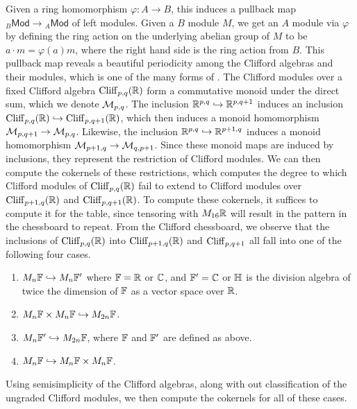 Given a ring homomorphism $\varphi : A \to B$, this induces a pullback map
${}_B\mathsf{Mod} \to {}_A\mathsf{Mod}$ of left modules. Given a $B$ module $M$,
we get an $A$ module via $\varphi$ by defining the ring action on the underlying
abelian group of $M$ to be $a \cdot m = \varphi(a)m$, where the right hand side
is the ring action from $B$. This pullback map reveals a beautiful periodicity
among the Clifford algebras and their modules, which is one of the many forms
of . The Clifford modules over a fixed Clifford algebra
$\operatorname{Cliff}_{p,q}(\mathbb{R})$ form a commutative monoid under the direct sum, which
we denote $\mathcal{M}_{p,q}$. The inclusion $\mathbb{R}^{p,q} \hookrightarrow \mathbb{R}^{p,q+1}$ induces
an inclusion $\operatorname{Cliff}_{p,q}(\mathbb{R}) \hookrightarrow \operatorname{Cliff}_{p,q+1}(\mathbb{R})$, which then
induces a monoid homomorphism $\mathcal{M}_{p,q+1} \to \mathcal{M}_{p,q}$. Likewise, the inclusion
$\mathbb{R}^{p,q}\hookrightarrow \mathbb{R}^{p+1,q}$ induces a monoid homomorphism
$\mathcal{M}_{p+1,q} \to \mathcal{M}_{q,p+1}$. Since these monoid maps are induced by
inclusions, they represent the restriction of Clifford modules. We can then
compute the cokernels of these restrictions, which computes the degree to
which Clifford modules of $\operatorname{Cliff}_{p,q}(\mathbb{R})$ fail to extend to Clifford modules
over $\operatorname{Cliff}_{p+1,q}(\mathbb{R})$ and $\operatorname{Cliff}_{p,q+1}(\mathbb{R})$. To compute these cokernels,
it suffices to compute it for the table, since tensoring with $M_{16}\mathbb{R}$ will
result in the pattern in the chessboard to repeat. From the Clifford chessboard,
we observe that the inclusions of $\operatorname{Cliff}_{p,q}(\mathbb{R})$ into $\operatorname{Cliff}_{p+1,q}(\mathbb{R})$
and $\operatorname{Cliff}_{p,q+1}$ all fall into one of the following four cases.
%
\begin{enumerate}
 \item $M_n\mathbb{F} \hookrightarrow M_n\mathbb{F}'$ where $\mathbb{F} = \mathbb{R}$ or $\mathbb{C}$, and $\mathbb{F}' = \mathbb{C}$
       or $\mathbb{H}$ is the division algebra of twice the dimension of $\mathbb{F}$ as a
       vector space over $\mathbb{R}$.
 \item $M_n\mathbb{F} \times M_n\mathbb{F} \hookrightarrow M_{2n}\mathbb{F}$.
 \item $M_n\mathbb{F}' \hookrightarrow M_{2n}\mathbb{F}$, where $\mathbb{F}$ and $\mathbb{F}'$ are defined as above.
 \item $M_n\mathbb{F} \hookrightarrow M_n\mathbb{F} \times M_n\mathbb{F}$.
\end{enumerate}
%
Using semisimplicity of the Clifford algebras, along with out classification of
the ungraded Clifford modules, we then compute the cokernels for all of these
cases.
%
